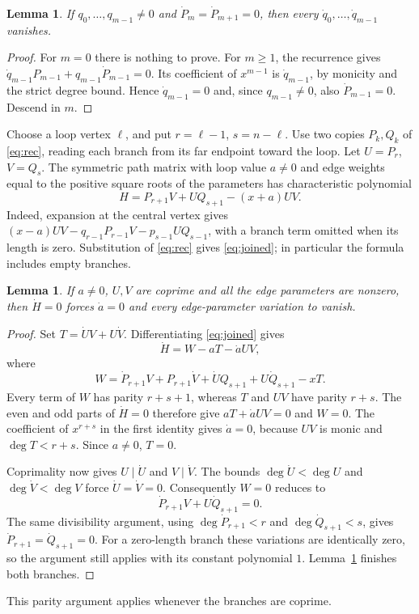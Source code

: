 \documentclass[11pt]{article}
\newtheorem{lemma}[theorem]{Lemma}
\begin{document}
\begin{lemma}\label{lem:recover}
If $q_0,\ldots,q_{m-1}\ne0$ and
$\dot P_m=\dot P_{m+1}=0$, then every
$\dot q_0,\ldots,\dot q_{m-1}$ vanishes.
\end{lemma}
\begin{proof}
For $m=0$ there is nothing to prove. For $m\geq1$, the recurrence gives
$\dot q_{m-1}P_{m-1}+q_{m-1}\dot P_{m-1}=0$.
Its coefficient of $x^{m-1}$ is $\dot q_{m-1}$, by monicity and the
strict degree bound. Hence $\dot q_{m-1}=0$ and, since
$q_{m-1}\ne0$, also $\dot P_{m-1}=0$. Descend in $m$.
\end{proof}

Choose a loop vertex $\ell$, and put $r=\ell-1$, $s=n-\ell$.
Use two copies $P_k,Q_k$ of \eqref{eq:rec}, reading each branch from
its far endpoint toward the loop. Let $U=P_r$, $V=Q_s$.
The symmetric path matrix with loop value $a\ne0$ and edge weights
equal to the positive square roots of the parameters has characteristic
polynomial
\begin{equation}\label{eq:joined}
 H=P_{r+1}V+UQ_{s+1}-(x+a)UV.
\end{equation}
Indeed, expansion at the central vertex gives
$(x-a)UV-q_{r-1}P_{r-1}V-p_{s-1}UQ_{s-1}$, with a branch term
omitted when its length is zero. Substitution of \eqref{eq:rec}
gives \eqref{eq:joined}; in particular the formula includes empty branches.

\begin{lemma}\label{lem:joined}
If $a\ne0$, $U,V$ are coprime and all the edge parameters are nonzero, then
$\dot H=0$ forces $\dot a=0$ and every edge-parameter variation to vanish.
\end{lemma}
\begin{proof}
Set $T=\dot U V+U\dot V$. Differentiating \eqref{eq:joined} gives
\[
 \dot H=W-aT-\dot aUV,
\]
where
\[
 W=\dot P_{r+1}V+P_{r+1}\dot V+
       \dot UQ_{s+1}+U\dot Q_{s+1}-xT.
\]
Every term of $W$ has parity $r+s+1$, whereas $T$ and $UV$ have
parity $r+s$. The even and odd parts of $\dot H=0$ therefore give
$aT+\dot aUV=0$ and $W=0$. The coefficient of $x^{r+s}$ in the first
identity gives $\dot a=0$, because $UV$ is monic and
$\deg T<r+s$. Since $a\ne0$, $T=0$.

Coprimality now gives $U\mid\dot U$ and $V\mid\dot V$.
The bounds $\deg\dot U<\deg U$ and
$\deg\dot V<\deg V$ force $\dot U=\dot V=0$.
Consequently $W=0$ reduces to
\[
 \dot P_{r+1}V+U\dot Q_{s+1}=0.
\]
The same divisibility argument, using
$\deg\dot P_{r+1}<r$ and $\deg\dot Q_{s+1}<s$, gives
$\dot P_{r+1}=\dot Q_{s+1}=0$.
For a zero-length branch these variations are identically zero, so
the argument still applies with its constant polynomial $1$.
Lemma~\ref{lem:recover} finishes both branches.
\end{proof}
This parity argument applies whenever the branches are coprime.
\end{document}

